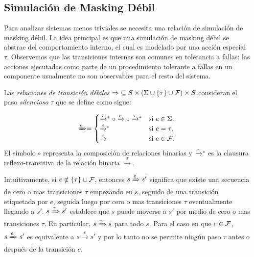 \subsection{Simulación de Masking Débil}

Para analizar sistemas menos triviales se necesita una relación de simulación de masking débil. La idea principal es que una simulación de masking débil se abstrae del comportamiento interno, el cual es modelado por una acción especial $\tau$. Observemos que las transiciones internas son comunes en tolerancia a fallas: las acciones ejecutadas como parte de un procedimiento tolerante a fallas en un componente usualmente no son observables para el resto del sistema.

Las \textit{relaciones de transición débiles} ${\Rightarrow} \subseteq S
\times (\Sigma \cup \{\tau\} \cup \mathcal{F}) \times S$ consideran el paso \emph{silencioso} $\tau$ que se define como sigue: 

\[
\xRightarrow{e} = 
       \begin{cases}
            \mathrel{{\xrightarrow[]{\tau}}{}^*} \circ \xrightarrow{e} \circ \mathrel{{\xrightarrow[]{\tau}}{}^*} & 
            \text{si } e \in \Sigma,  \\ 
            \mathrel{{\xrightarrow[]{e}}{}^*} & \text{si } e = \tau,  \\
            \xrightarrow{e} & \text{si } e \in \mathcal{F}.\\
       \end{cases}
\]
%
El símbolo $\circ$ representa la composición de relaciones binarias y $\mathrel{{\xrightarrow[]{\tau}}{}^*}$ es la clausura reflexo-transitiva de la relación binaria $\xrightarrow{\tau}$. 

Intuitivamente, si $e \notin \{\tau\}\cup\mathcal{F}$, entonces $s\xRightarrow{e}s'$ significa que existe una secuencia de cero o mas transiciones $\tau$ empezando en $s$, seguido de una transición etiquetada por $e$, seguida luego por cero o mas transiciones $\tau$ eventualmente llegando a  $s'$.
$s \xRightarrow{\tau} s'$ establece que $s$ puede moverse a $s'$ por medio de cero o mas transiciones $\tau$.
%
En particular, $s \xRightarrow{\tau} s$ para todo $s$.
%
Para el caso en que $e\in\mathcal{F}$,
$s\xRightarrow{e}s'$ es equivalente a $s\xrightarrow{e}s'$ y por lo tanto
no se permite ningún paso $\tau$ antes o después de la transición $e$.


